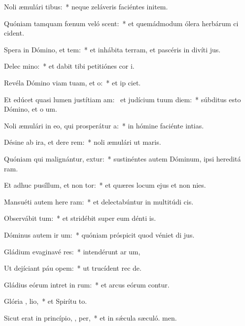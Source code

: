 \item Noli æmulári  tibus:~* neque zeláveris faciéntes initem.
\item Quóniam tamquam fœnum veló scent:~* et quemádmodum ólera herbárum ci cident.
\item Spera in Dómino, et  tem:~* et inhábita terram, et pascéris in divíti jus.
\item Delec  mino:~* et dabit tibi petitiónes cor i.
\item Revéla Dómino viam tuam, et   o:~* et ip ciet.
\item Et edúcet quasi lumen justítiam am:~\pscross{} et judícium tuum  diem:~* súbditus esto Dómino, et o um.
\item Noli æmulári in eo, qui prosperátur   a:~* in hómine faciénte intias.
\item Désine ab ira, et dere rem:~* noli æmulári ut maris.
\item Quóniam qui malignántur, extur:~* sustinéntes autem Dóminum, ipsi hereditá ram.
\item Et adhuc pusíllum, et non  tor:~* et quæres locum ejus et non nies.
\item Mansuéti autem here ram:~* et delectabúntur in multitúdi cis.
\item Observábit  tum:~* et stridébit super eum dénti is.
\item Dóminus autem ir um:~* quóniam próspicit quod véniet di jus.
\item Gládium evaginavé res:~* intendérunt ar um,
\item Ut dejíciant páu  opem:~* ut trucídent rec de.
\item Gládius eórum intret in  rum:~* et arcus eórum contur.
\item Glória ,  lio,~* et Spirítu to.
\item Sicut erat in princípio,  ,  per,~* et in sǽcula sæculó. men.
